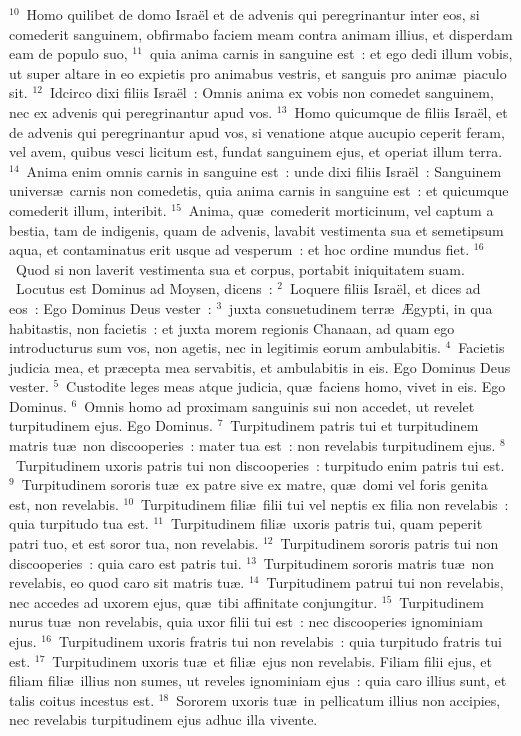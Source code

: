 ${}^{10}$~Homo quilibet de domo Isra\"el et de advenis qui peregrinantur inter eos, si comederit sanguinem, obfirmabo faciem meam contra animam illius, et disperdam eam de populo suo,
${}^{11}$~quia anima carnis in sanguine est~: et ego dedi illum vobis, ut super altare in eo expietis pro animabus vestris, et sanguis pro anim\ae\ piaculo sit.
${}^{12}$~Idcirco dixi filiis Isra\"el~: Omnis anima ex vobis non comedet sanguinem, nec ex advenis qui peregrinantur apud vos.
${}^{13}$~Homo quicumque de filiis Isra\"el, et de advenis qui peregrinantur apud vos, si venatione atque aucupio ceperit feram, vel avem, quibus vesci licitum est, fundat sanguinem ejus, et operiat illum terra.
${}^{14}$~Anima enim omnis carnis in sanguine est~: unde dixi filiis Isra\"el~: Sanguinem univers\ae\ carnis non comedetis, quia anima carnis in sanguine est~: et quicumque comederit illum, interibit.
${}^{15}$~Anima, qu\ae\ comederit morticinum, vel captum a bestia, tam de indigenis, quam de advenis, lavabit vestimenta sua et semetipsum aqua, et contaminatus erit usque ad vesperum~: et hoc ordine mundus fiet.
${}^{16}$~Quod si non laverit vestimenta sua et corpus, portabit iniquitatem suam.
~\lettrine[lines=10,image=true,loversize=0.05,lraise=-0.03]{L}{}ocutus est Dominus ad Moysen, dicens~:
${}^{2}$~Loquere filiis Isra\"el, et dices ad eos~: Ego Dominus Deus vester~:
${}^{3}$~juxta consuetudinem terr\ae\ \AE gypti, in qua habitastis, non facietis~: et juxta morem regionis Chanaan, ad quam ego introducturus sum vos, non agetis, nec in legitimis eorum ambulabitis.
${}^{4}$~Facietis judicia mea, et pr\ae cepta mea servabitis, et ambulabitis in eis. Ego Dominus Deus vester.
${}^{5}$~Custodite leges meas atque judicia, qu\ae\ faciens homo, vivet in eis. Ego Dominus.
${}^{6}$~Omnis homo ad proximam sanguinis sui non accedet, ut revelet turpitudinem ejus. Ego Dominus.
${}^{7}$~Turpitudinem patris tui et turpitudinem matris tu\ae\ non discooperies~: mater tua est~: non revelabis turpitudinem ejus.
${}^{8}$~Turpitudinem uxoris patris tui non discooperies~: turpitudo enim patris tui est.
${}^{9}$~Turpitudinem sororis tu\ae\ ex patre sive ex matre, qu\ae\ domi vel foris genita est, non revelabis.
${}^{10}$~Turpitudinem fili\ae\ filii tui vel neptis ex filia non revelabis~: quia turpitudo tua est.
${}^{11}$~Turpitudinem fili\ae\ uxoris patris tui, quam peperit patri tuo, et est soror tua, non revelabis.
${}^{12}$~Turpitudinem sororis patris tui non discooperies~: quia caro est patris tui.
${}^{13}$~Turpitudinem sororis matris tu\ae\ non revelabis, eo quod caro sit matris tu\ae .
${}^{14}$~Turpitudinem patrui tui non revelabis, nec accedes ad uxorem ejus, qu\ae\ tibi affinitate conjungitur.
${}^{15}$~Turpitudinem nurus tu\ae\ non revelabis, quia uxor filii tui est~: nec discooperies ignominiam ejus.
${}^{16}$~Turpitudinem uxoris fratris tui non revelabis~: quia turpitudo fratris tui est.
${}^{17}$~Turpitudinem uxoris tu\ae\ et fili\ae\ ejus non revelabis. Filiam filii ejus, et filiam fili\ae\ illius non sumes, ut reveles ignominiam ejus~: quia caro illius sunt, et talis coitus incestus est.
${}^{18}$~Sororem uxoris tu\ae\ in pellicatum illius non accipies, nec revelabis turpitudinem ejus adhuc illa vivente.


